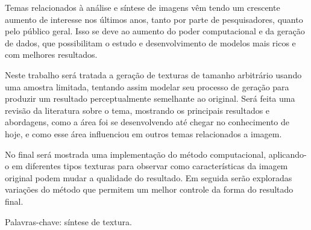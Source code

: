 \setlength{\absparsep}{18pt} 
\begin{resumo}[Resumo]
 
Temas relacionados à análise e síntese de imagens vêm
tendo um crescente aumento de interesse nos últimos anos,
tanto por parte de pesquisadores, quanto pelo público geral.
Isso se deve ao aumento do poder computacional e da
geração de dados, que possibilitam o estudo e desenvolvimento
de modelos mais ricos e com melhores resultados.

Neste trabalho será tratada a geração de texturas de
tamanho arbitrário usando uma amostra limitada,
tentando assim modelar seu processo de geração para
produzir um resultado perceptualmente semelhante
ao original. Será feita uma revisão da literatura
sobre o tema, mostrando os principais resultados e
abordagens, como a área foi se desenvolvendo até
chegar no conhecimento de hoje, e como esse área
influenciou em outros temas relacionados a imagem.

No final será mostrada uma implementação do método
computacional, aplicando-o
em diferentes tipos texturas para observar como
características da imagem original podem mudar a
qualidade do resultado. Em seguida serão exploradas
variações do método que permitem um melhor controle
da forma do resultado final.


 Palavras-chave: síntese de textura.
\end{resumo}

%
